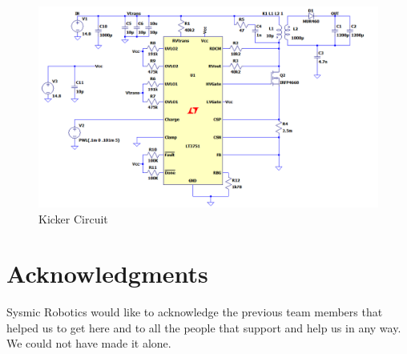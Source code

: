 \documentclass{llncs}
\begin{document}
\begin{figure}[h]
    \centering
    \includegraphics[scale=0.4]{Images/kicker_spice.png}
    \caption{Kicker Circuit}
    \label{fig:kicker}
\end{figure}



{
    \renewcommand{\clearpage}{} 
    
}



\section*{Acknowledgments}

Sysmic Robotics would like to acknowledge the previous team members that helped us to get here and to all the people that support and help us in any way. We could not have made it alone.

\end{document}
